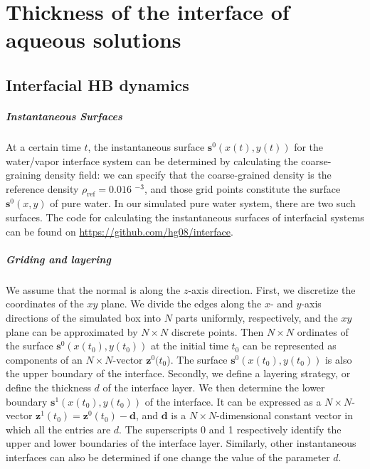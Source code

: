 \chapter{Thickness of the interface of aqueous solutions} \label{thickness_interface}
\section{Interfacial HB dynamics} \label{ihb_and_selection}
\paragraph{Instantaneous Surfaces}
At a certain time $t$, the instantaneous surface ${\mathbf s}^0(x(t),y(t))$ for the water/vapor interface system can be determined by calculating 
the coarse-graining density field: we can specify that the coarse-grained density is the reference density $\rho_\text{ref} = 0.016 $ \A$^{-3}$,
and those grid points constitute the surface ${\mathbf s}^0(x,y)$ of pure water. In our simulated pure water system, there are two such surfaces.
The code for calculating the instantaneous surfaces of interfacial systems can be found on \url{https://github.com/hg08/interface}. 
\paragraph{Griding and layering}
We assume that the normal is along the $z$-axis direction. 
First, we discretize the coordinates of the $xy$ plane. 
We divide the edges along the $x$- and  $y$-axis directions of the simulated box into $N$ parts uniformly, respectively, 
and the $xy$ plane can be approximated by $N\times N$ discrete points. 
Then $N\times N$ ordinates of the surface ${\mathbf s}^0(x(t_0),y(t_0))$ at the initial time $t_0$ can be represented as components of an $N\times N$-vector ${\mathbf z}^0(t_0$). 
The surface ${\mathbf s}^0(x(t_0),y(t_0))$ is also the upper boundary of the interface.
Secondly, we define a layering strategy, or define the thickness $d$ of the interface layer. 
We then determine the lower boundary ${\mathbf s}^1(x(t_0),y(t_0))$ of the interface. 
It can be expressed as a $N\times N$-vector ${\mathbf z}^1(t_0)={\mathbf z}^0(t_0)-{\mathbf d}$, and ${\mathbf d}$ is a $N\times N$-dimensional constant 
vector in which all the entries are $d$. The superscripts 0 and 1 respectively identify the upper and lower boundaries of the interface layer. 
Similarly, other instantaneous interfaces can also be determined if one change the value of the parameter $d$.


